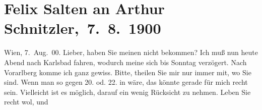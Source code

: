 

         
         \renewcommand{\erwaehntePersonen}{Personen: Felix Salten}
         \renewcommand{\erwaehnteOrte}{Orte: Bad Ischl, Karlsbad, Pressbaum, Schruns, Vorarlberg, Wien}
         \renewcommand{\erwaehnteWerke}{}
               \section[ Felix Salten an Arthur Schnitzler, 7. 8. 1900]{ Felix Salten an Arthur Schnitzler, 7. 8. 1900}\nopagebreak{}\rehead{ }\begin{ledgroupsized}[t]{13cm}\normalsize\beginnumbering \toendnotes[C]{\smallbreak\pagebreak[2]} 
\toendnotes[C]{\smallbreak}\pstart
           \raggedleft{}{\pb}Wien, 7. Aug. 00.\pend
           \pstart
           Lieber, haben Sie meinen \label{K_L03308-1v}\label{K_L03308-1h} nicht bekommen? Ich muß nun heute{ }Abend nach Karlsbad fahren, wodurch
               meine \label{K_L03308-2v}\label{K_L03308-2h} sich bis Sonntag
               verzögert. Nach Vorarlberg komme ich ganz
               gewiss. Bitte, theilen Sie mir nur immer mit, wo Sie sind. Wenn man so gegen 20. od. 22. in \label{K_L03308-3v}\label{K_L03308-3h} wäre, das könnte gerade für mich recht sein.\pend
           \pstart
           Vielleicht ist es möglich, darauf ein wenig Rücksicht zu nehmen.\pend
           \pstart
           {\pb}Leben Sie recht wol, und

\end{ledgroupsized}
